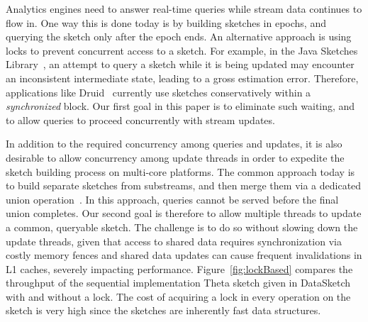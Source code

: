  Analytics engines need to answer real-time queries while  stream data continues to flow in.
 One way this is done 
today is by building sketches in epochs, and querying the sketch only after
 the epoch ends. An alternative approach is using locks to prevent concurrent access to a sketch.
 For example, in the Java Sketches Library~\cite{sketchesLibrary},  an 
attempt to query a sketch  while it is being updated  may encounter an inconsistent
intermediate state, leading to a gross estimation error. Therefore, applications like Druid~\cite{druid}
currently use sketches conservatively within a \emph{synchronized} block.
Our first goal in this paper is to eliminate such waiting, and to allow queries to proceed 
concurrently with stream updates. 

In addition to the required concurrency among queries and updates,
it is also desirable to allow
concurrency among update threads in order to expedite the sketch building process on multi-core platforms. 
The common approach today is to build separate sketches from substreams, 
and then merge them via a dedicated union operation~\cite{multi-KMV}. 
In this approach, queries cannot be served before the final union completes. 
Our second goal is therefore to allow multiple threads to update a common, 
queryable sketch. The challenge is to do so without slowing down the update threads,
given that access to shared data requires  synchronization via costly memory fences 
and shared data updates can cause frequent invalidations in L1 caches, severely impacting performance. 
Figure~\ref{fig:lockBased} compares the throughput of the
sequential implementation Theta sketch given in DataSketch with
and without a lock.
The cost of acquiring a lock in every
operation on the sketch is very high since the sketches are
inherently fast data structures.

